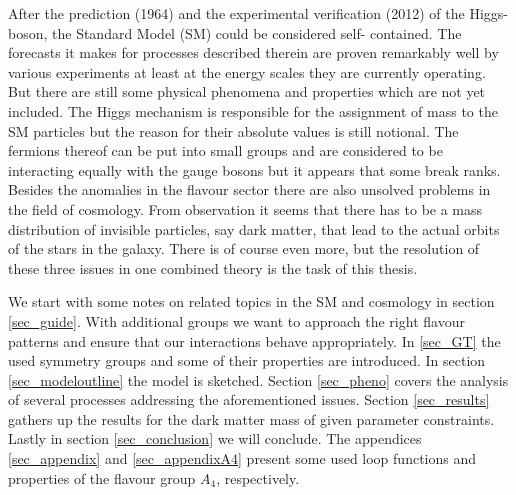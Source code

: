 After the prediction (1964) and the experimental verification (2012) of the
Higgs-boson, the Standard Model (SM) could be considered self-
contained. The forecasts it makes for processes described therein are proven
remarkably well by various experiments at least at the energy scales they
are currently operating. But there are still some physical phenomena and
properties which are not yet included. The Higgs mechanism is responsible
for the assignment of mass to the SM particles but the reason for their
absolute values is still notional. The fermions thereof can be put into
small groups and are considered to be interacting equally with the gauge bosons but it appears
that some break ranks. Besides the anomalies in the flavour sector there are also unsolved problems
in the field of cosmology. From observation it seems that there has to be a mass distribution of
invisible particles, say dark matter, that lead to the actual orbits of the stars in the galaxy.
There is of course even more, but the resolution of these three issues in one combined theory is
the task of this thesis.

\noindent We start with some notes on 
related topics in the SM and cosmology in section \ref{sec_guide}. With additional groups we want
to approach the right flavour patterns and ensure that our interactions behave appropriately. In \ref{sec_GT} the used symmetry groups and some of 
their properties are introduced. In section \ref{sec_modeloutline} the model
is sketched. Section \ref{sec_pheno} covers the analysis of several processes addressing the aforementioned issues. 
Section \ref{sec_results} gathers up the results for the dark matter mass of given parameter constraints.
Lastly in section \ref{sec_conclusion} we will conclude. The appendices \ref{sec_appendix} and \ref{sec_appendixA4} present some 
 used loop functions and properties of the flavour group $A_4$, respectively.
